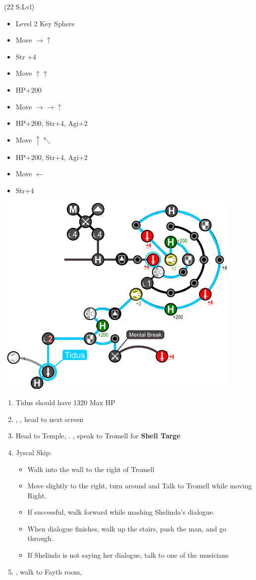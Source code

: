 \begin{spheregrid}
	\begin{itemize}
		\tidusf (22 S.Lvl)
		\begin{itemize}
			\item Level 2 Key Sphere
			\item Move $\rightarrow\uparrow$
			\item Str +4
			\item Move $\uparrow\uparrow$
			\item HP+200
			\item Move $\rightarrow\rightarrow\uparrow$
			\item HP+200, Str+4, Agi+2
			\item Move $\uparrow\nwarrow$
			\item HP+200, Str+4, Agi+2
			\item Move $\leftarrow$
			\item Str+4
		\end{itemize}
		\includegraphics[width=.8\columnwidth]{graphics/Tidus_post_crawler_loss}
	\end{itemize}
\end{spheregrid}
\begin{enumerate}[resume]
	\item Tidus should have 1320 Max HP
	\item \sd, \cs[0:40], head to next screen
	\item Head to Temple, \sd. \save, speak to Tromell for \textbf{Shell Targe}
	\item Jyscal Skip:
	      \begin{itemize}
		      \item Walk into the wall to the right of Tromell
		      \item Move slightly to the right, turn around and Talk to Tromell while moving Right.
		      \item If successful, walk forward while mashing Shelinda's dialogue.
		      \item When dialogue finishes, walk up the stairs, push the man, and go through.
		      \item If Shelinda is not saying her dialogue, talk to one of the musicians
	      \end{itemize}
	\item \sd, walk to Fayth room, \cs[2:10]
\end{enumerate}
